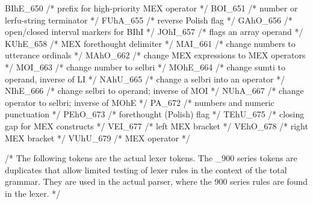 BIhE_650         /*        prefix for high-priority MEX operator */
BOI_651          /*        number or lerfu-string terminator */
FUhA_655         /*        reverse Polish flag */
GAhO_656         /*        open/closed interval markers for BIhI */
JOhI_657         /*        flags an array operand */
KUhE_658         /*        MEX forethought delimiter */
MAI_661          /*        change numbers to utterance ordinals */
MAhO_662         /*        change MEX expressions to MEX operators */
MOI_663          /*        change number to selbri */
MOhE_664         /*        change sumti to operand, inverse of LI */
NAhU_665         /*        change a selbri into an operator */
NIhE_666         /*        change selbri to operand; inverse of MOI */
NUhA_667         /*        change operator to selbri; inverse of MOhE */
PA_672           /*        numbers and numeric punctuation */
PEhO_673         /*        forethought (Polish) flag */
TEhU_675         /*        closing gap for MEX constructs */
VEI_677          /*        left MEX bracket */
VEhO_678         /*        right MEX bracket */
VUhU_679         /*        MEX operator */


/* The following tokens are the actual lexer tokens.  The _900 series
tokens are duplicates that allow limited testing of lexer rules in the
context of the total grammar.  They are used in the actual parser, where
the 900 series rules are found in the lexer.  */

